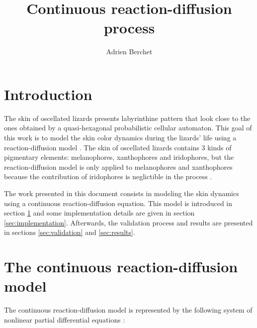 \documentclass[a4paper]{article}
\begin{document}
\title{Continuous reaction-diffusion process}
\author{Adrien Berchet}

\maketitle

\section*{Introduction}

The skin of oscellated lizards presents labyrinthine pattern that look close to the ones obtained by a quasi-hexagonal probabilistic cellular automaton. This goal of this work is to model the skin color dynamics during the lizards' life using a reaction-diffusion model \citep{Manukyan2017}. The skin of oscellated lizards contains 3 kinds of pigmentary elements: melanophores, xanthophores and iridophores, but the reaction-diffusion model is only applied to melanophores and xanthophores because the contribution of iridophores is neglictible in the process \citep{Nakamasu8429}.

The work presented in this document consists in modeling the skin dynamics using a continuous reaction-diffusion equation. This model is introduced in section \ref{sec:continuous_rd} and some implementation details are given in section \ref{sec:implementation}. Afterwards, the validation process and results are presented in sections \ref{sec:validation} and \ref{sec:results}.

\section{The continuous reaction-diffusion model}
\label{sec:continuous_rd}

The continuous reaction-diffusion model is represented by the following system of nonlinear partial differential equations \citep{Nakamasu8429}:
\end{document}
